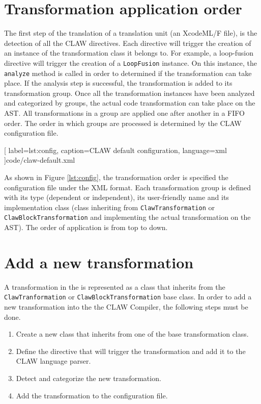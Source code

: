 \section{Transformation application order}
The first step of the translation of a translation unit (an XcodeML/F file),
is the detection of all the CLAW directives. Each directive will trigger the
creation of an instance of the transformation class it belongs to. For example,
a loop-fusion directive will trigger the creation of a \lstinline|LoopFusion|
instance. On this instance, the \lstinline|analyze| method is called in order
to determined if the transformation can take place. If the analysis step is
successful, the transformation is added to its transformation group.
Once all the transformation instances have been analyzed and categorized by
groups, the actual code transformation can take place on the AST. All
transformations in a group are applied one after another in a FIFO order.
The order in which groups are processed is determined by the CLAW configuration
file.


  [
    label=lst:config,
    caption=CLAW default configuration,
    language=xml
  ]{code/claw-default.xml}

As shown in Figure \ref{lst:config}, the transformation order is specified the
configuration file under the XML format.
Each transformation group is defined with its type (dependent or
independent), its user-friendly name and its implementation class (class
inheriting from \lstinline|ClawTransformation| or
\lstinline|ClawBlockTransformation| and implementing the actual transformation
on the AST). The order of application is from top to down.


\section{Add a new transformation}
A transformation in the \clawfc is represented as a class that inherits from
the \lstinline|ClawTranformation| or \lstinline|ClawBlockTransformation|
base class. In order to add a new transformation into the the CLAW Compiler,
the following steps must be done.

\begin{enumerate}
\item Create a new class that inherits from one of the base transformation
      class.
\item Define the directive that will trigger the transformation and add it
      to the CLAW language parser.
\item Detect and categorize the new transformation.
\item Add the transformation to the configuration file.
\end{enumerate}

